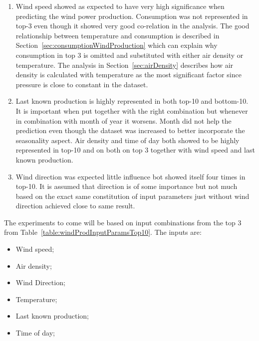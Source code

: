 \begin{enumerate}
\item Wind speed showed as expected to have very high significance when predicting the wind power production. Consumption was not represented in top-3 even though it showed very good co-relation in the analysis. The good relationship between temperature and consumption is described in Section~\ref{sec:consumptionWindProduction} which can explain why consumption in top 3 is omitted and substituted with either air density or temperature. The analysis in Section~\ref{sec:airDensity} describes how air density is calculated with temperature as the most significant factor since pressure is close to constant in the dataset.   
\item Last known production is highly represented in both top-10 and bottom-10. It is important when put together with the right combination but whenever in combination with month of year it worsens. Month did not help the prediction even though the dataset was increased to better incorporate the seasonality aspect. Air density and time of day both showed to be highly represented in top-10 and on both on top 3 together with wind speed and last known production.
\item Wind direction was expected little influence bot showed itself four times in top-10. It is assumed that direction is of some importance but not much based on the exact same constitution of input parameters just without wind direction achieved close to same result.
\end{enumerate}

The experiments to come will be based on input combinations from the top 3 from Table~\ref{table:windProdInputParamsTop10}. The inputs are:
\begin{itemize}
\item Wind speed;
\item Air density;
\item Wind Direction;
\item Temperature;
\item Last known production;
\item Time of day;
\end{itemize}
\newpage
